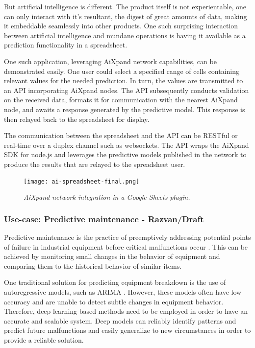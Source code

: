 \documentclass{article}
\begin{document}
But artificial intelligence is different. The product itself is not experientable, one can only interact with it's resultant, the digest of great amounts of data, making it embeddable seamlessly into other products. One such surprising interaction between artificial intelligence and mundane operations is having it available as a prediction functionality in a spreadsheet.

One such application, leveraging AiXpand network capabilities, can be demonstrated easily. One user could select a specified range of cells containing relevant values for the needed prediction. In turn, the values are transmitted to an API incorporating AiXpand nodes. The API subsequently conducts validation on the received data, formats it for communication with the nearest AiXpand node, and awaits a response generated by the predictive model. This response is then relayed back to the spreadsheet for display.

The communication between the spreadsheet and the API can be RESTful or real-time over a duplex channel such as websockets. The API wraps the AiXpand SDK for node.js and leverages the predictive models published in the network to produce the results that are relayed to the spreadsheet user.

\begin{figure}
    \centering
    \texttt{[image: ai-spreadsheet-final.png]}
    \caption{\textit{AiXpand network integration in a Google Sheets plugin.}}
    \label{fig:ai-spreadsheet}
\end{figure}

\subsubsection{Use-case: Predictive maintenance - Razvan/Draft}
Predictive maintenance is the practice of preemptively addressing potential points of failure in industrial equipment before critical malfunctions occur \cite{mobley2002introduction}. This can be achieved by monitoring small changes in the behavior of equipment and comparing them to the historical behavior of similar items.

One traditional solution for predicting equipment breakdown is the use of autoregressive models, such as ARIMA \cite{kanawaday2017machine}. However, these models often have low accuracy and are unable to detect subtle changes in equipment behavior. Therefore, deep learning based methods \cite{zhao2019deep} need to be employed in order to have an accurate and scalable system. Deep models can reliably identify patterns and predict future malfunctions and easily generalize to new circumstances in order to provide a reliable solution.
\end{document}
